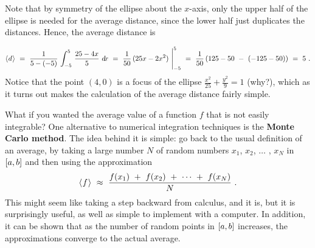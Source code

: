 \begin{exmp}
\noindent Note that by symmetry of the ellipse about the
$x$-axis, only the upper half of the ellipse is needed for the average distance,
since the lower half just duplicates the distances. Hence, the average distance is

\[
\langle\mspace{1mu}d\mspace{1mu}\rangle ~=~ \frac{1}{5 - (-5)}\,\int_{-5}^5\,\frac{25 - 4x}{5}~d\!x ~=~
\frac{1}{50}\,(25x - 2x^2)~\Biggr|_{-5}^5 ~=~ \frac{1}{50}\,(125 - 50 ~-~ (-125 - 50))
~=~ 5 ~.
\]
Notice that the point $(4,0)$ is a focus of the ellipse
$\frac{x^2}{25} + \frac{y^2}{9} = 1$ (why?), which as it turns out makes the
calculation of the average distance fairly simple.
\end{exmp}
\divider
\vspace{3mm}

What if you wanted the average value of a function $f$ that is not easily
integrable? One alternative to numerical integration techniques is the
\textbf{Monte Carlo method}. The idea behind it is
simple: go back to the usual definition of an average, by taking a large
number $N$ of random numbers $x_1$, $x_2$, $\ldots$ , $x_N$ in
$\lbrack a,b \rbrack$ and then using the approximation
\[
\langle\mspace{1mu}f\mspace{1mu}\rangle ~\approx~ \frac{f(x_1) ~+~ f(x_2) ~+~ \cdots ~+~ f(x_N)}{N} ~.
\]
This might seem like taking a step backward from calculus, and it is, but it is
surprisingly useful, as well as simple to implement with a computer. In addition,
it can be shown that as the number of random points in $\lbrack a,b \rbrack$ increases,
the approximations converge to the actual average.
\newpage
